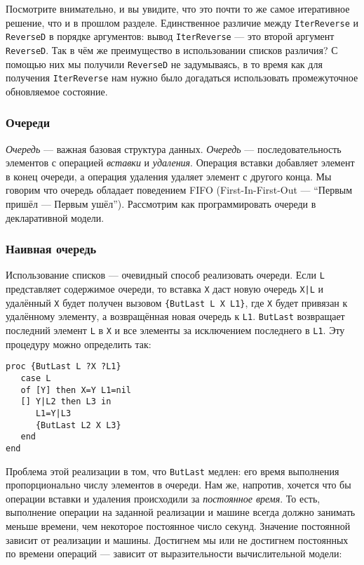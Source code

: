 Посмотрите внимательно, и вы увидите, что это почти то же самое итеративное решение, что и в прошлом разделе. Единственное различие между \lstinline!IterReverse! и \lstinline!ReverseD! в порядке аргументов: вывод \lstinline!IterReverse! --- это второй аргумент \lstinline!ReverseD!. Так в чём же преимущество в использовании списков различия? С помощью них мы получили \lstinline!ReverseD! не задумываясь, в то время как для получения \lstinline!IterReverse! нам нужно было догадаться использовать промежуточное обновляемое состояние.

\subsubsection{Очереди}

\emph{Очередь} --- важная базовая структура данных. \emph{Очередь} --- последовательность элементов с операцией \emph{вставки} и \emph{удаления}. Операция вставки добавляет элемент в конец очереди, а операция удаления удаляет элемент с другого конца. Мы говорим что очередь обладает поведением FIFO (First-In-First-Out --- ``Первым пришёл --- Первым ушёл''). Рассмотрим как программировать очереди в декларативной модели.

\subsubsection{Наивная очередь}

Использование списков --- очевидный способ реализовать очереди. Если \lstinline!L! представляет содержимое очереди, то вставка \lstinline!X! даст новую очередь \lstinline!X|L! и удалённый \lstinline!X! будет получен вызовом \lstinline!{ButLast L X L1}!, где \lstinline!X! будет привязан к удалённому элементу, а возвращённая новая очередь к \lstinline!L1!. \lstinline!ButLast! возвращает последний элемент \lstinline!L! в \lstinline!X! и все элементы за исключением последнего в \lstinline!L1!. Эту процедуру можно определить так:

\begin{lstlisting}
proc {ButLast L ?X ?L1}
   case L
   of [Y] then X=Y L1=nil
   [] Y|L2 then L3 in
      L1=Y|L3
      {ButLast L2 X L3}
   end
end
\end{lstlisting}

Проблема этой реализации в том, что \lstinline!ButLast! медлен: его время выполнения пропорционально числу элементов в очереди. Нам же, напротив, хочется что бы операции вставки и удаления происходили за \emph{постоянное время}. То есть, выполнение операции на заданной реализации и машине всегда должно занимать меньше времени, чем некоторое постоянное число секунд. Значение постоянной зависит от реализации и машины. Достигнем мы или не достигнем постоянных по времени операций --- зависит от выразительности вычислительной модели:

